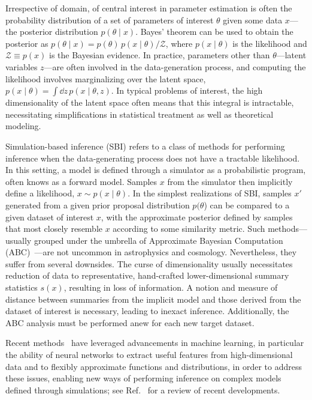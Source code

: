 \documentclass[prd,aps,10pt,nofootinbib,twocolumn,superscriptaddress,preprintnumbers,balancelastpage,longbibliography]{revtex4-1}
\begin{document}
Irrespective of domain, of central interest in parameter estimation is often the probability distribution of a set of parameters of interest $\theta$ given some data $x$---the posterior distribution $p(\theta\mid x)$. Bayes' theorem can be used to obtain the posterior as $p(\theta\mid x) = p(\theta)\, p(x\mid\theta) / \mathcal Z$, where $p(x\mid\theta)$ is the likelihood and $\mathcal Z \equiv p(x)$ is the Bayesian evidence. In practice, parameters other than $\theta$---latent variables $z$---are often involved in the data-generation process, and computing the likelihood involves marginalizing over the latent space, $p(x\mid\theta) = \int \dd z\,p(x\mid\theta, z)$. In typical problems of interest, the high dimensionality of the latent space often means that this integral is intractable, necessitating simplifications in statistical treatment as well as theoretical modeling. 


Simulation-based inference (SBI) refers to a class of methods for performing inference when the data-generating process does not have a tractable likelihood. In this setting, a model is defined through a simulator as a probabilistic program, often knows as a forward model. Samples $x$ from the simulator then implicitly define a likelihood, $x\sim p(x\mid\theta)$. In the simplest realizations of SBI, samples $x'$ generated from a given prior proposal distribution $p(\theta$) can be compared to a given dataset of interest $x$, with the approximate posterior defined by samples that most closely resemble $x$ according to some similarity metric. Such methods---usually grouped under the umbrella of Approximate Bayesian Computation (ABC)~\cite{10.1214/aos/1176346785}---are not uncommon in astrophysics and cosmology. Nevertheless, they suffer from several downsides. The curse of dimensionality usually necessitates reduction of data to representative, hand-crafted lower-dimensional summary statistics $s(x)$, resulting in loss of information. A notion and measure of distance between summaries from the implicit model and those derived from the dataset of interest is necessary, leading to inexact inference. Additionally, the ABC analysis must be performed anew for each new target dataset.

Recent methods~\cite{Alsing:2019xrx,Brehmer:2018eca,Brehmer:2018hga,Brehmer:2018kdj,Brehmer:2020cvb,Cranmer:2015bka,cranmerFrontierSimulationbasedInference2020,durkanContrastiveLearningLikelihoodfree2020,greenbergAutomaticPosteriorTransformation2019,Hermans:2019ioj,lueckmannBenchmarkingSimulationBasedInference2021,lueckmannLikelihoodfreeInferenceEmulator2019,pacchiardiGeneralizedBayesianLikelihoodFree2021,papamakariosFastEpsilonFree2018,papamakariosSequentialNeuralLikelihood2019,wiqvistSequentialNeuralPosterior2021,zhaoValidatingConditionalDensity2021} have leveraged advancements in machine learning, in particular the ability of neural networks to extract useful features from high-dimensional data and to flexibly approximate functions and distributions, in order to address these issues, enabling new ways of performing inference on complex models defined through simulations; see Ref.~\cite{cranmer2020frontier} for a review of recent developments.
\end{document}
